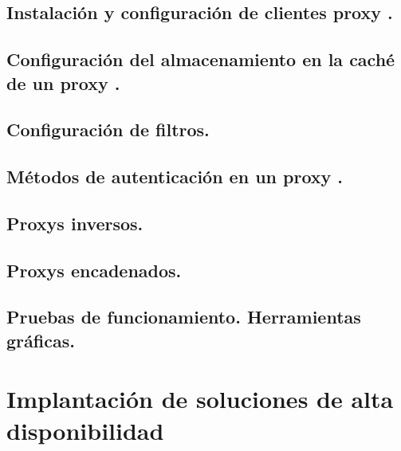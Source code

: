 \documentclass[letterpaper,10pt,spanish]{sphinxmanual}
\begin{document}
\section{Instalación y configuración de clientes  proxy .}
\label{\detokenize{tema_proxys/tema_proxys:instalacion-y-configuracion-de-clientes-proxy}}

\section{Configuración del almacenamiento en la caché de un  proxy .}
\label{\detokenize{tema_proxys/tema_proxys:configuracion-del-almacenamiento-en-la-cache-de-un-proxy}}

\section{Configuración de filtros.}
\label{\detokenize{tema_proxys/tema_proxys:configuracion-de-filtros}}

\section{Métodos de autenticación en un  proxy .}
\label{\detokenize{tema_proxys/tema_proxys:metodos-de-autenticacion-en-un-proxy}}

\section{Proxys  inversos.}
\label{\detokenize{tema_proxys/tema_proxys:proxys-inversos}}

\section{Proxys  encadenados.}
\label{\detokenize{tema_proxys/tema_proxys:proxys-encadenados}}

\section{Pruebas de funcionamiento. Herramientas gráficas.}
\label{\detokenize{tema_proxys/tema_proxys:pruebas-de-funcionamiento-herramientas-graficas}}

\chapter{Implantación de soluciones de alta disponibilidad}
\label{\detokenize{tema_sad/tema_sad:implantacion-de-soluciones-de-alta-disponibilidad}}\label{\detokenize{tema_sad/tema_sad::doc}}
\end{document}

